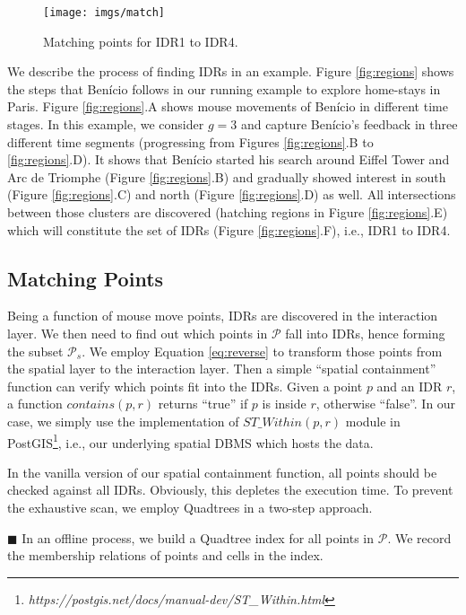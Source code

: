 \documentclass[sigconf,edbt]{acmart-edbt2019}
\begin{document}
\begin{figure}[t]
\centering
   \texttt{[image: imgs/match]}
  \caption{Matching points for IDR1 to IDR4.}
  \label{fig:match}
\end{figure}

\vspace{2pt}
We describe the process of finding IDRs in an example. Figure \ref{fig:regions} shows the steps that Ben\'icio follows in our running example to explore home-stays in Paris. Figure \ref{fig:regions}.A shows mouse movements of Ben\'icio in different time stages. In this example, we consider $g = 3$ and capture Ben\'icio's feedback in three different time segments (progressing from Figures \ref{fig:regions}.B to \ref{fig:regions}.D). It shows that Ben\'icio started his search around Eiffel Tower and Arc de Triomphe (Figure \ref{fig:regions}.B) and gradually showed interest in south (Figure \ref{fig:regions}.C) and north (Figure \ref{fig:regions}.D) as well. All intersections between those clusters are discovered (hatching regions in Figure \ref{fig:regions}.E) which will constitute the set of IDRs (Figure \ref{fig:regions}.F), i.e., IDR1 to IDR4.

\subsection{Matching Points}
Being a function of mouse move points, IDRs are discovered in the interaction layer. We then need to find out which points in $\mathcal{P}$ fall into IDRs, hence forming the subset $\mathcal{P}_s$. We employ Equation \ref{eq:reverse} to transform those points from the spatial layer to the interaction layer. Then a simple ``spatial containment'' function can verify which points fit into the IDRs. Given a point $p$ and an IDR $r$, a function $\mathit{contains}(p,r)$ returns ``true'' if $p$ is inside $r$, otherwise ``false''. In our case, we simply use the implementation of $\mathit{ST\_Within}(p,r)$ module in PostGIS\footnote{\it https://postgis.net/docs/manual-dev/ST\_Within.html}, i.e., our underlying spatial DBMS which hosts the data.

\vspace{2pt}
In the vanilla version of our spatial containment function, all points should be checked against all IDRs. Obviously, this depletes the execution time. To prevent the exhaustive scan, we employ Quadtrees in a two-step approach.

\vspace{4pt}
\noindent $\blacksquare$ In an offline process, we build a Quadtree index for all points in $\mathcal{P}$. We record the membership relations of points and cells in the index.
\end{document}
